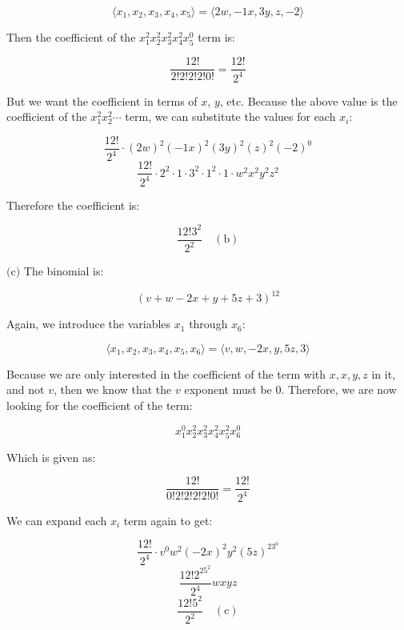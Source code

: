 \documentclass{article}
\newcommand{\subproblem}[1]{$\boxed{\text{(#1)}}$}
\newcommand{\subsolution}[2]{\boxed{#2\quad(\text{#1})}}
\begin{document}
\begin{multicols*}{2}
\[
\langle x_1,x_2,x_3,x_4,x_5\rangle=\langle 2w,-1x, 3y, z, -2\rangle
\]

Then the coefficient of the $x_1^2x_2^2x_3^2x_4^2x_5^0$ term is:

\[
\frac{12!}{2!2!2!2!0!}=\frac{12!}{2^4}
\]

But we want the coefficient in terms of $x$, $y$, etc. Because the
above value is the coefficient of the $x_1^2x_2^2\cdots$ term, we can
substitute the values for each $x_i$:

\[
\frac{12!}{2^4}\cdot(2w)^2(-1x)^2(3y)^2(z)^2(-2)^0
\] \[
\frac{12!}{2^4}\cdot2^2\cdot1\cdot3^2\cdot1^2\cdot1\cdot w^2x^2y^2z^2
\]

Therefore the coefficient is:

\[
\subsolution{b}{\frac{12!3^2}{2^2}}
\]

%
\subproblem{c} The binomial is:

\[
(v+w-2x+y+5z+3)^{12}
\]

Again, we introduce the variables $x_1$ through $x_6$:

\[
\langle x_1,x_2,x_3,x_4,x_5,x_6\rangle=\langle v, w, -2x, y, 5z, 3\rangle
\]

Because we are only interested in the coefficient of the term with
$x,x,y,z$ in it, and not $v$, then we know that the $v$ exponent must
be 0. Therefore, we are now looking for the coefficient of the term:

\[
x_1^0x_2^2x_3^2x_4^2x_5^2x_6^0
\]

Which is given as:

\[
\frac{12!}{0!2!2!2!2!0!}=\frac{12!}{2^4}
\]

We can expand each $x_i$ term again to get:

\[
\frac{12!}{2^4}\cdot v^0w^2(-2x)^2y^2(5z)^23^0
\] \[
\frac{12!2^25^2}{2^4} w x y z
\] \[
\subsolution{c}{\frac{12!5^2}{2^2}}
\]


\end{multicols*}
\end{document}
